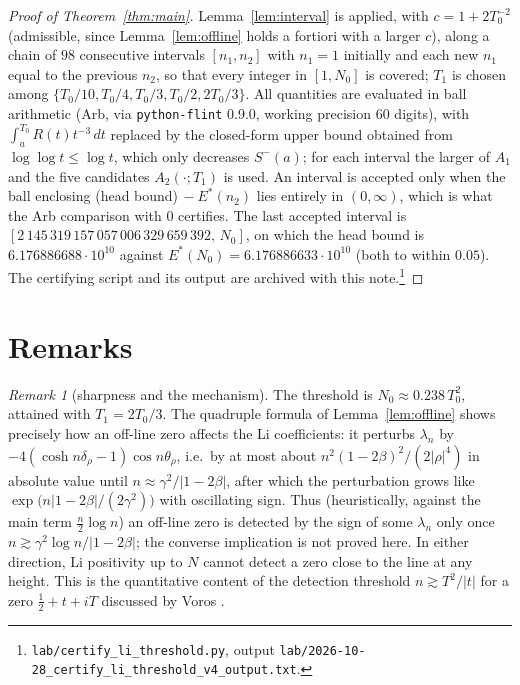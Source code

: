 \documentclass[11pt]{article}
\theoremstyle{remark}
\newtheorem{remark}[theorem]{Remark}
\begin{document}
\begin{proof}[Proof of Theorem~\ref{thm:main}]
Lemma~\ref{lem:interval} is applied, with $c=1+2T_0^{-2}$ (admissible, since Lemma~\ref{lem:offline} holds a fortiori with a larger $c$), along a chain of $98$ consecutive intervals $[n_1,n_2]$ with $n_1=1$ initially and each new $n_1$ equal to the previous $n_2$, so that every integer in $[1,N_0]$ is covered; $T_1$ is chosen among $\{T_0/10,T_0/4,T_0/3,T_0/2,2T_0/3\}$. All quantities are evaluated in ball arithmetic (Arb, via \texttt{python-flint} 0.9.0, working precision 60 digits), with $\int_a^{T_0}R(t)t^{-3}\,dt$ replaced by the closed-form upper bound obtained from $\log\log t\le\log t$, which only decreases $S^-(a)$; for each interval the larger of $A_1$ and the five candidates $A_2(\cdot;T_1)$ is used. An interval is accepted only when the ball enclosing (head bound)$\,-E^*(n_2)$ lies entirely in $(0,\infty)$, which is what the Arb comparison with $0$ certifies. The last accepted interval is $[2\,145\,319\,157\,057\,006\,329\,659\,392,\,N_0]$, on which the head bound is $6.176886688\cdot10^{10}$ against $E^*(N_0)=6.176886633\cdot10^{10}$ (both to within $0.05$). The certifying script and its output are archived with this note.\footnote{\texttt{lab/certify\_li\_threshold.py}, output \texttt{lab/2026-10-28\_certify\_li\_threshold\_v4\_output.txt}.}
\end{proof}

\section{Remarks}

\begin{remark}[sharpness and the mechanism]
The threshold is $N_0\approx0.238\,T_0^2$, attained with $T_1=2T_0/3$. The quadruple formula of Lemma~\ref{lem:offline} shows precisely how an off-line zero affects the Li coefficients: it perturbs $\lambda_n$ by $-4(\cosh n\delta_\rho-1)\cos n\theta_\rho$, i.e.\ by at most about $n^2(1-2\beta)^2/(2|\rho|^4)$ in absolute value until $n\approx\gamma^2/|1-2\beta|$, after which the perturbation grows like $\exp\bigl(n|1-2\beta|/(2\gamma^2)\bigr)$ with oscillating sign. Thus (heuristically, against the main term $\tfrac n2\log n$) an off-line zero is detected by the sign of some $\lambda_n$ only once $n\gtrsim\gamma^2\log n/|1-2\beta|$; the converse implication is not proved here. In either direction, Li positivity up to $N$ cannot detect a zero close to the line at any height. This is the quantitative content of the detection threshold $n\gtrsim T^2/|t|$ for a zero $\tfrac12+t+iT$ discussed by Voros \cite[\S1]{Vor17}.
\end{remark}
\end{document}
